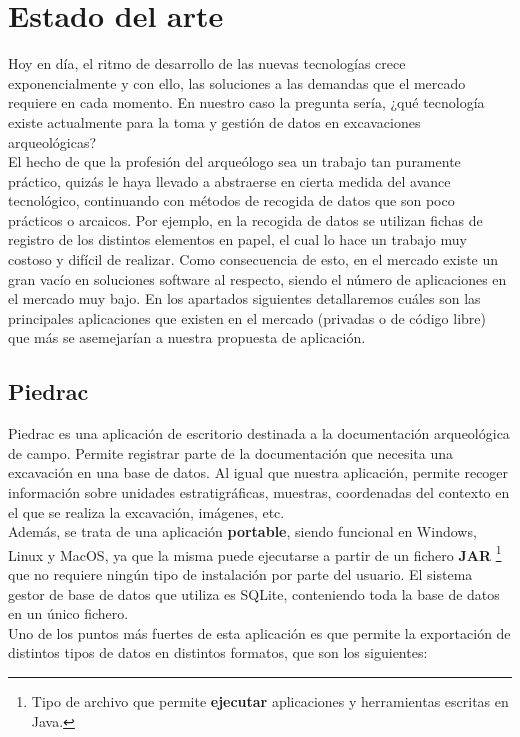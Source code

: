 \chapter{Estado del arte}
Hoy en día, el ritmo de desarrollo de las nuevas tecnologías crece exponencialmente y con
ello, las soluciones a las demandas que el mercado requiere en cada momento. En nuestro
caso la pregunta sería, ¿qué tecnología existe actualmente para la toma y gestión de datos
en excavaciones arqueológicas?\\

El hecho de que la profesión del arqueólogo sea un trabajo tan puramente práctico, quizás
le haya llevado a abstraerse en cierta medida del avance tecnológico, continuando con
métodos de recogida de datos que son poco prácticos o arcaicos. Por ejemplo, en la recogida
de datos se utilizan fichas de registro de los distintos elementos en papel, el cual lo
hace un trabajo muy costoso y difícil de realizar. Como consecuencia de esto, en el mercado
existe un gran vacío en soluciones software al respecto, siendo el número de aplicaciones
en el mercado muy bajo. En los apartados siguientes detallaremos cuáles son las
principales aplicaciones que existen en el mercado (privadas o de código libre)
que más se asemejarían a nuestra propuesta de aplicación.\\

\section{Piedrac}
Piedrac \cite{piedrac} es una aplicación de escritorio destinada a la documentación
arqueológica de campo. Permite registrar parte de la documentación que necesita una
excavación en una base de datos. Al igual que nuestra aplicación, permite recoger
información sobre unidades estratigráficas, muestras, coordenadas del contexto en el que
se realiza la excavación, imágenes, etc.\\

Además, se trata de una aplicación \textbf{portable}, siendo funcional en Windows, Linux
y MacOS, ya que la misma puede ejecutarse a partir de  un fichero \textbf{JAR}
\footnote{Tipo de archivo que permite \textbf{ejecutar} aplicaciones y herramientas escritas
en Java.} que no requiere ningún tipo de instalación por parte del usuario. El sistema
gestor de base de datos que utiliza es SQLite, conteniendo toda la base de datos en un
único fichero.\\

Uno de los puntos más fuertes de esta aplicación es que permite la exportación de distintos
tipos de datos en distintos formatos, que son los siguientes:

